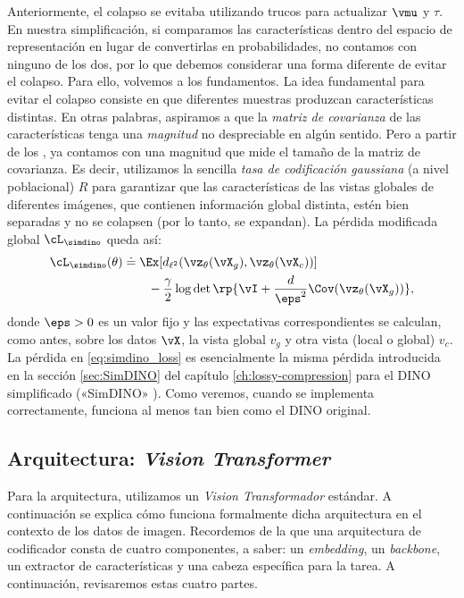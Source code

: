 \documentclass[../../book-main_es.tex]{subfiles}
\begin{document}
Anteriormente, el colapso se evitaba utilizando trucos para actualizar \(\vmu\) y
\(\tau\). En nuestra simplificación, si comparamos las características dentro
del espacio de representación en lugar de convertirlas en probabilidades,
no contamos con ninguno de los dos, por lo que debemos considerar una
forma diferente de evitar el colapso. Para ello, volvemos a los
fundamentos. La idea fundamental para evitar el colapso consiste en que 
diferentes muestras produzcan características distintas. En
otras palabras, aspiramos a que la \textit{matriz de covarianza} de las características tenga
una \textit{magnitud} no despreciable en algún sentido. Pero a partir de
los , ya contamos con una magnitud
que mide el tamaño de la matriz de covarianza. Es decir, utilizamos la
sencilla \textit{tasa de codificación gaussiana} (a nivel poblacional)
\(R\) para garantizar que las características de las vistas globales de diferentes
imágenes, que contienen información global distinta, estén bien separadas
y no se colapsen (por lo tanto, se expandan). La pérdida modificada global
\(\cL_{\simdino}\) queda así:
\begin{align}\label{eq:simdino_loss}
    \cL_{\simdino}(\theta) &\doteq \Ex[d_{\ell^{2}}(\vz_{\theta}(\vX_{g}),
    \vz_{\theta}(\vX_{c}))] \\
    &\qquad - \frac{\gamma}{2}\log\det\rp{\vI +
    \frac{d}{\eps^{2}}\Cov(\vz_{\theta}(\vX_{g}))},
\end{align}
donde \(\eps > 0\) es un valor fijo y las expectativas correspondientes se calculan, como
antes, sobre los datos \(\vX\), la vista global \(v_{g}\) y otra
vista (local o global) \(v_{c}\). La pérdida en \eqref{eq:simdino_loss}
es esencialmente la misma pérdida introducida en la sección \ref{sec:SimDINO}
del capítulo \ref{ch:lossy-compression} para el DINO simplificado
(«SimDINO» \cite{wu2025simplifying}). Como veremos, cuando se implementa correctamente,
funciona al menos tan bien como el DINO original.

\subsection{Arquitectura: \textit{Vision
Transformer}}\label{sub:contrastive_learning_architecture}

Para la arquitectura, utilizamos un \textit{Vision Transformador} estándar. A continuación se explica
cómo funciona formalmente dicha arquitectura en el contexto de los datos de imagen.
Recordemos de la  que una arquitectura de codificador consta de cuatro
componentes, a saber: un \textit{embedding}, un
\textit{backbone}, un extractor de características y una cabeza específica para la tarea. A continuación, revisaremos
estas cuatro partes.
\end{document}
